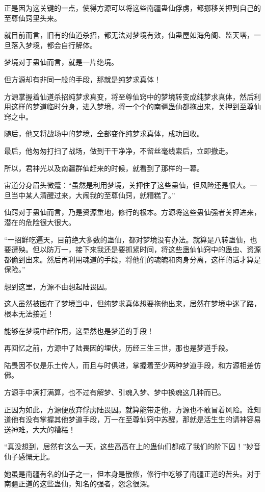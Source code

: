 \begin{this_body}
正是因为这关键的一点，使得方源可以将这些南疆蛊仙俘虏，都挪移关押到自己的至尊仙窍里头来。

就目前而言，旧有的仙道杀招，都无法对梦境有效，仙蛊屋如海角阁、监天塔，一旦落入梦境，都会自行解体。

梦境对于蛊仙而言，就是一片绝境。

但方源却有非同一般的手段，那就是纯梦求真体！

方源掌握着仙道杀招纯梦求真变，将至尊仙窍中的梦境转变成纯梦求真体，然后利用这样的梦道临时分身，进入梦境，将一个个的南疆蛊仙都拖出来，关押到至尊仙窍之中。

随后，他又将战场中的梦境，全部变作纯梦求真体，成功回收。

最后，他匆匆打扫了战场，做到干干净净，不留丝毫线索后，立即撤走。

所以，君神光以及南疆群仙赶来的时候，就看到了那样的一幕。

宙道分身眉头微蹙：“虽然是利用梦境，关押住了这些蛊仙，但风险还是很大。一旦当中某人清醒过来，大闹我的至尊仙窍，就糟糕了。”

仙窍对于蛊仙而言，乃是资源重地，修行的根本。方源将这些蛊仙强者关押进来，潜在的危险很大很大。

“一招鲜吃遍天，目前绝大多数的蛊仙，都对梦境没有办法。就算是八转蛊仙，也要遭殃。但以防万一，接下来我还是要抓紧时间，将这些蛊仙仙窍中的蛊虫、资源都偷到出来。然后再利用魂道的手段，将他们的魂魄和肉身分离，这样的话才算是保险。”

想到这里，方源不由想起陆畏因。

这人虽然被困在了梦境当中，但纯梦求真体想要拖他出来，居然在梦境中迷了路，根本无法接近！

能够在梦境中起作用，这显然也是梦道的手段！

再回忆之前，方源中了陆畏因的埋伏，历经三生三世，那也是梦道手段。

陆畏因不仅是乐土传人，而且与时俱进，掌握着至少两种梦道手段，和方源相差仿佛。

方源手中满打满算，也不过有解梦、引魂入梦、梦中换魂这几种而已。

正因为如此，方源便放弃俘虏陆畏因。就算能带走他，方源也不敢冒着风险。谁知道他有没有掌握其他梦道手段，万一在至尊仙窍中苏醒，那就是活生生的请神容易送神难，大大的糟糕！

“真没想到，居然有这么一天，这些高高在上的蛊仙们都成了我们的阶下囚！”妙音仙子感慨无比。

她虽是南疆有名的仙子之一，但本身是散修，修行中吃够了南疆正道的苦头。对于南疆正道的这些蛊仙，知名的强者，怨念很深。


\end{this_body}
